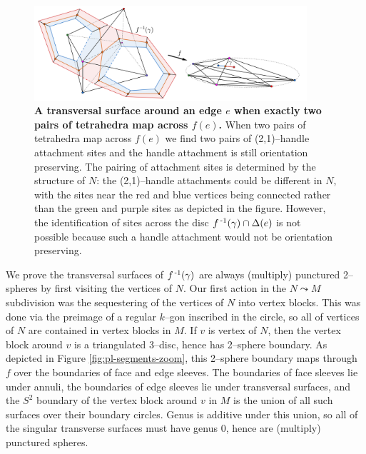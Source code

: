 \begin{figure}[h!]
	\centering
	\includegraphics[width=0.9\textwidth]{figures/pl-indefinite-fold.png}
	\caption{
		\textbf{A transversal surface around an edge $e$ when exactly two pairs of tetrahedra map across $f(e)$.}
		When two pairs of tetrahedra map across $f(e)$ we find two pairs of (2,1)--handle attachment sites and the handle attachment is still orientation preserving.
		The pairing of attachment sites is determined by the structure of $N$: the (2,1)--handle attachments could be different in $N$, with the sites near the red and blue vertices being connected rather than the green and purple sites as depicted in the figure.
		However, the identification of sites across the disc $f^{\,\text{-}1}(\gamma)\cap\Delta(e)$ is not possible because such a handle attachment would not be orientation preserving.
	}
	\label{fig:pl-indefinite-fold}
\end{figure}

We prove the transversal surfaces of $f^{\,\text{-}1}(\gamma)$ are always (multiply) punctured 2--spheres by first visiting the vertices of $N$.
Our first action in the $N\leadsto M$ subdivision was the sequestering of the vertices of $N$ into vertex blocks.
This was done via the preimage of a regular $k$--gon inscribed in the circle, so all of vertices of $N$ are contained in vertex blocks in $M$.
If $v$ is vertex of $N$, then the vertex block around $v$ is a triangulated 3--disc, hence has 2--sphere boundary.
As depicted in Figure \ref{fig:pl-segments-zoom}, this 2--sphere boundary maps through $f$ over the boundaries of face and edge sleeves.
The boundaries of face sleeves lie under annuli, the boundaries of edge sleeves lie under transversal surfaces, and the $S^2$ boundary of the vertex block around $v$ in $M$ is the union of all such surfaces over their boundary circles.
Genus is additive under this union, so all of the singular transverse surfaces must have genus 0, hence are (multiply) punctured spheres.

